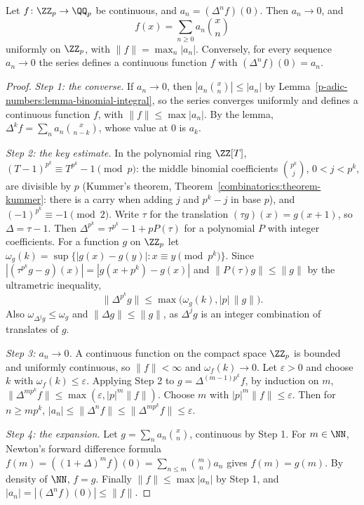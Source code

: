 \begin{theorem}[Mahler]\label{p-adic-numbers:theorem-mahler}
Let $f \colon \ZZ_p \to \QQ_p$ be continuous, and $a_n = (\Delta^nf)(0)$. Then $a_n \to 0$, and
\[
f(x) = \sum_{n \geq 0}a_n\binom xn
\]
uniformly on $\ZZ_p$, with $\|f\| = \max_n|a_n|$. Conversely, for every sequence $a_n \to 0$ the series defines a continuous function $f$ with $(\Delta^nf)(0) = a_n$.
\end{theorem}

\begin{proof}
\emph{Step 1: the converse.} If $a_n \to 0$, then $|a_n\binom xn| \leq |a_n|$ by Lemma~\ref{p-adic-numbers:lemma-binomial-integral}, so the series converges uniformly and defines a continuous function $f$, with
$\|f\| \leq \max|a_n|$. By the lemma, $\Delta^kf = \sum_na_n\binom{x}{n - k}$, whose value at $0$ is $a_k$.

\emph{Step 2: the key estimate.} In the polynomial ring $\ZZ[T]$, $(T - 1)^{p^k} \equiv T^{p^k} - 1 \pmod p$: the middle binomial coefficients $\binom{p^k}{j}$, $0 < j < p^k$, are divisible by $p$
(Kummer's theorem, Theorem~\ref{combinatorics:theorem-kummer}: there is a carry when adding $j$ and $p^k - j$ in base $p$), and $(-1)^{p^k} \equiv -1 \pmod 2$. Write $\tau$ for the translation $(\tau g)(x) = g(x + 1)$, so $\Delta = \tau - 1$. Then
$\Delta^{p^k} = \tau^{p^k} - 1 + pP(\tau)$ for a polynomial $P$ with integer coefficients. For a function $g$ on $\ZZ_p$ let $\omega_g(k) = \sup\{|g(x) - g(y)| : x \equiv y \pmod{p^k}\}$. Since
$|(\tau^{p^k}g - g)(x)| = |g(x + p^k) - g(x)|$ and $\|P(\tau)g\| \leq \|g\|$ by the ultrametric inequality,
\[
\|\Delta^{p^k}g\| \leq \max\bigl(\omega_g(k), |p|\,\|g\|\bigr).
\]
Also $\omega_{\Delta^jg} \leq \omega_g$ and $\|\Delta g\| \leq \|g\|$, as $\Delta^jg$ is an integer combination of translates of $g$.

\emph{Step 3: $a_n \to 0$.} A continuous function on the compact space $\ZZ_p$ is bounded and uniformly continuous, so $\|f\| < \infty$ and $\omega_f(k) \to 0$. Let $\varepsilon > 0$ and choose $k$ with
$\omega_f(k) \leq \varepsilon$. Applying Step 2 to $g = \Delta^{(m-1)p^k}f$, by induction on $m$, $\|\Delta^{mp^k}f\| \leq \max(\varepsilon, |p|^m\|f\|)$. Choose $m$ with $|p|^m\|f\| \leq \varepsilon$. Then for
$n \geq mp^k$, $|a_n| \leq \|\Delta^nf\| \leq \|\Delta^{mp^k}f\| \leq \varepsilon$.

\emph{Step 4: the expansion.} Let $g = \sum_na_n\binom xn$, continuous by Step 1. For $m \in \NN$, Newton's forward difference formula $f(m) = ((1 + \Delta)^mf)(0) = \sum_{n \leq m}\binom mna_n$ gives
$f(m) = g(m)$. By density of $\NN$, $f = g$. Finally $\|f\| \leq \max|a_n|$ by Step 1, and $|a_n| = |(\Delta^nf)(0)| \leq \|f\|$.
\end{proof}


